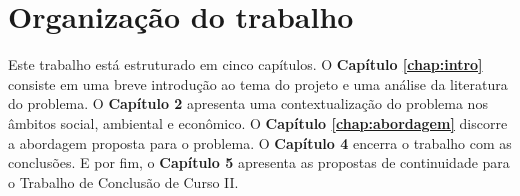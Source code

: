 

\section{Organização do trabalho} %
\label{sec:organização_do_trabalho}
Este trabalho está estruturado em cinco capítulos. O \textbf{Capítulo \ref{chap:intro}} consiste em uma breve introdução ao tema do projeto e uma análise da literatura do problema. O \textbf{Capítulo 2} apresenta uma contextualização do problema nos âmbitos social, ambiental e econômico. O \textbf{Capítulo \ref{chap:abordagem}} discorre a abordagem proposta para o problema. O \textbf{Capítulo 4} encerra o trabalho com as conclusões. E por fim, o \textbf{Capítulo 5} apresenta as propostas de continuidade para o Trabalho de Conclusão de Curso II.




